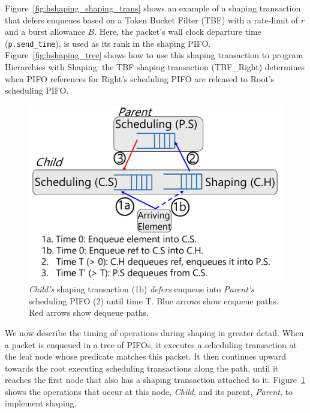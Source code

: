 
Figure~\ref{fig:hshaping_shaping_trans} shows an example of a shaping
transaction that defers enqueues based on a Token Bucket Filter (TBF)
with a rate-limit of $r$ and a burst allowance $B$. Here, the packet's
wall clock departure time ({\tt p.send\_time}), is used as its rank in
the shaping PIFO. Figure~\ref{fig:hshaping_tree} shows how to use this
shaping transaction to program Hierarchies with Shaping: the TBF
shaping transaction (TBF\_Right) determines when PIFO references for
Right's scheduling PIFO are released to Root's scheduling PIFO.

\begin{figure}[!t]
  \centering
  \includegraphics[width=0.6\columnwidth]{pifo_shaping_semantics.pdf}
  \caption{\textit{Child's} shaping transaction (1b) {\em defers} enqueue
  into \textit{Parent's} scheduling PIFO (2) until time T.  Blue arrows
  show enqueue paths. Red arrows show dequeue paths.  }
  \label{fig:shaping_trans}
\end{figure}

We now describe the timing of operations during shaping in greater detail.
When a packet is enqueued in a tree of PIFOs, it executes a scheduling
transaction at the leaf node whose predicate matches this packet.  It then
continues upward towards the root executing scheduling transactions along the
path, until it reaches the first node that also has a shaping transaction
attached to it. Figure~\ref{fig:shaping_trans} shows the operations that occur
at this node, {\em Child}, and its parent, {\em Parent}, to implement shaping.

